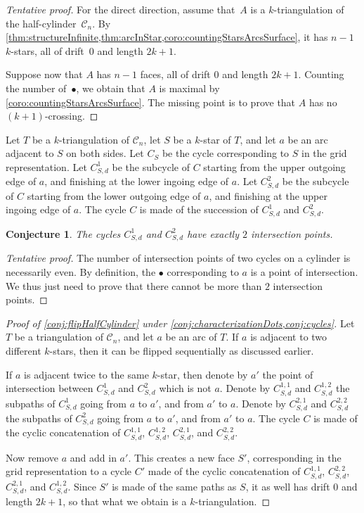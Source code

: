 \documentclass{amsart}
\newtheorem{conjecture}[theorem]{Conjecture}
\theoremstyle{remark}
\newcommand{\cylinder}{\mathcal{C}}
\begin{document}
\begin{proof}[Tentative proof]
For the direct direction, assume that~$A$ is a $k$-triangulation of the half-cylinder~$\cylinder_n$.
By \cref{thm:structureInfinite,thm:arcInStar,coro:countingStarsArcsSurface}, it has $n-1$ $k$-stars, all of drift~$0$ and length $2k+1$.

Suppose now that $A$ has $n-1$ faces, all of drift $0$ and length $2k+1$. 
Counting the number of~$\bullet$, we obtain that $A$ is maximal by \cref{coro:countingStarsArcsSurface}.
The missing point is to prove that $A$ has no $(k+1)$-crossing.
\end{proof}

Let $T$ be a $k$-triangulation of $\cylinder_n$, let $S$ be a $k$-star of $T$, and let $a$ be an arc adjacent to $S$ on both sides.
Let $C_S$ be the cycle corresponding to $S$ in the grid representation.
Let $C_{S,d}^1$ be the subcycle of $C$ starting from the upper outgoing edge of $a$, and finishing at the lower ingoing edge of $a$.
Let $C_{S,d}^2$ be the subcycle of $C$ starting from the lower outgoing edge of $a$, and finishing at the upper ingoing edge of $a$.
The cycle $C$ is made of the succession of $C_{S,d}^1$ and $C_{S,d}^2$.

\begin{conjecture}
\label{conj:cycles}
The cycles $C_{S,d}^1$ and $C_{S,d}^2$ have exactly $2$ intersection points.
\end{conjecture}

\begin{proof}[Tentative proof]
The number of intersection points of two cycles on a cylinder is necessarily even. By definition, the $\bullet$ corresponding to $a$ is a point of intersection.
We thus just need to prove that there cannot be more than $2$ intersection points.
\end{proof}

\begin{proof}[Proof of \cref{conj:flipHalfCylinder} under \cref{conj:characterizationDots,conj:cycles}]
Let $T$ be a triangulation of $\cylinder_n$, and let $a$ be an arc of $T$.
If $a$ is adjacent to two different $k$-stars, then it can be flipped sequentially as discussed earlier.

If $a$ is adjacent twice to the same $k$-star, then denote by $a'$ the point of intersection between $C_{S,d}^1$ and $C_{S,d}^2$ which is not $a$.
Denote by $C_{S,d}^{1,1}$ and $C_{S,d}^{1,2}$ the subpaths of $C_{S,d}^1$ going from $a$ to $a'$, and from $a'$ to $a$.
Denote by $C_{S,d}^{2,1}$ and $C_{S,d}^{2,2}$ the subpaths of $C_{S,d}^2$ going from $a$ to $a'$, and from $a'$ to $a$.
The cycle $C$ is made of the cyclic concatenation of $C_{S,d}^{1,1}$, $C_{S,d}^{1,2}$, $C_{S,d}^{2,1}$, and $C_{S,d}^{2,2}$.

Now remove $a$ and add in $a'$. This creates a new face $S'$, corresponding in the grid representation to a cycle $C'$ made of the cyclic concatenation of $C_{S,d}^{1,1}$, $C_{S,d}^{2,2}$, $C_{S,d}^{2,1}$, and $C_{S,d}^{1,2}$.
Since $S'$ is made of the same paths as $S$, it as well has drift $0$ and length $2k+1$, so that what we obtain is a $k$-triangulation.
\end{proof}




\end{document}
